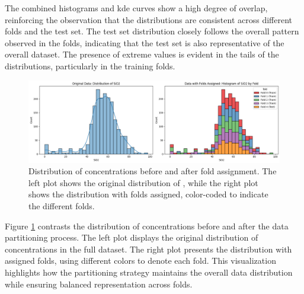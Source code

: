 The combined histograms and \gls{kde} curves show a high degree of overlap, reinforcing the observation that the distributions are consistent across different folds and the test set.
The test set distribution closely follows the overall pattern observed in the folds, indicating that the test set is also representative of the overall dataset.
The presence of extreme values is evident in the tails of the distributions, particularly in the training folds.

\begin{figure}[h!]
    \centering
    \includegraphics[width=\textwidth]{images/original_and_post_fold.png}
    \caption{Distribution of  concentrations before and after fold assignment. The left plot shows the original distribution of , while the right plot shows the distribution with folds assigned, color-coded to indicate the different folds.}
    \label{fig:original_and_post_fold_plot}
\end{figure}

Figure \ref{fig:original_and_post_fold_plot} contrasts the distribution of  concentrations before and after the data partitioning process.
The left plot displays the original distribution of  concentrations in the full dataset.
The right plot presents the distribution with assigned folds, using different colors to denote each fold.
This visualization highlights how the partitioning strategy maintains the overall data distribution while ensuring balanced representation across folds.